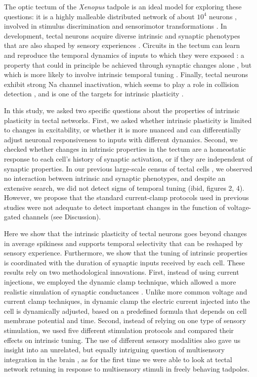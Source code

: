 \documentclass{article}
\begin{document}
The optic tectum of the \textit{Xenopus} tadpole is an ideal model for exploring these questions: it is a highly malleable distributed network of about $10^4$ neurons \citep{pratt2013}, involved in stimulus discrimination and sensorimotor transformations \citep{dong2009,khakhalin2014}. In development, tectal neurons acquire diverse intrinsic and synaptic phenotypes that are also shaped by sensory experiences \citep{xu2011,ciarleglio2015}. Circuits in the tectum can learn and reproduce the temporal dynamics of inputs to which they were exposed \citep{pratt2008}: a property that could in principle be achieved through synaptic changes alone \citep{lukovsevivcius2009}, but which is more likely to involve intrinsic temporal tuning \citep{narayanan2008,beatty2014}. Finally, tectal neurons exhibit strong Na channel inactivation, which seems to play a role in collision detection \citep{jang2016}, and is one of the targets for intrinsic plasticity \citep{bianchi2012}.

In this study, we asked two specific questions about the properties of intrinsic plasticity in tectal networks. First, we asked whether intrinsic plasticity is limited to changes in excitability, or whether it is more nuanced and can differentially adjust neuronal responsiveness to inputs with different dynamics. Second, we checked whether changes in intrinsic properties in the tectum are a homeostatic response to each cell's history of synaptic activation, or if they are independent of synaptic properties. In our previous large-scale census of tectal cells \citep{ciarleglio2015}, we observed no interaction between intrinsic and synaptic phenotypes, and despite an extensive search, we did not detect signs of temporal tuning (ibid,  figures 2, 4). However, we propose that the standard current-clamp protocols used in previous studies \citep{pratt2007,hamodi2014} were not adequate to detect important changes in the function of voltage-gated channels (see Discussion). 

Here we show that the intrinsic plasticity of tectal neurons goes beyond changes in average spikiness and supports temporal selectivity that can be reshaped by sensory experience. Furthermore, we show that the tuning of intrinsic properties is coordinated with the duration of synaptic inputs received by each cell. These results rely on two methodological innovations. First, instead of using current injections, we employed the dynamic clamp technique, which allowed a more realistic simulation of synaptic conductances \citep{prinz2004}. Unlike more common voltage and current clamp techniques, in dynamic clamp the electric current injected into the cell is dynamically adjusted, based on a predefined formula that depends on cell membrane potential and time. Second, instead of relying on one type of sensory stimulation, we used five different stimulation protocols and compared their effects on intrinsic tuning. The use of different sensory modalities also gave us insight into an unrelated, but equally intriguing question of multisensory integration in the brain \citep{deeg2009,felch2016,truszkowski2017}, as for the first time we were able to look at tectal network retuning in response to multisensory stimuli in freely behaving tadpoles.
\end{document}
